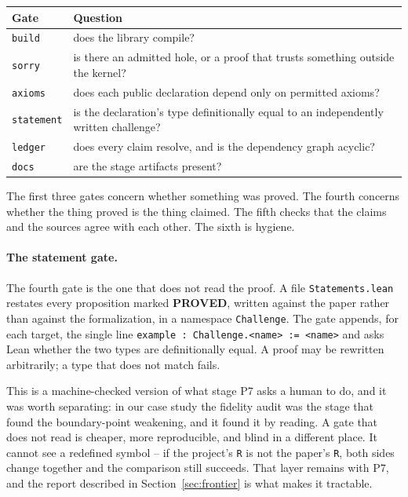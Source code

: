 \documentclass[11pt]{article}
\newcommand{\claim}[1]{\textbf{#1}}
\newcommand{\code}[1]{\texttt{#1}}
\begin{document}
\begin{center}
\begin{tabular}{@{}ll@{}}
\toprule
Gate & Question \\
\midrule
\code{build} & does the library compile? \\
\code{sorry} & is there an admitted hole, or a proof that trusts
  something outside the kernel? \\
\code{axioms} & does each public declaration depend only on permitted axioms? \\
\code{statement} & is the declaration's type definitionally equal to an
  independently written challenge? \\
\code{ledger} & does every claim resolve, and is the dependency graph acyclic? \\
\code{docs} & are the stage artifacts present? \\
\bottomrule
\end{tabular}
\end{center}

The first three gates concern whether something was proved. The fourth
concerns whether the thing proved is the thing claimed. The fifth checks
that the claims and the sources agree with each other. The sixth is
hygiene.

\paragraph{The statement gate.} The fourth gate is the one that does not read
the proof. A file \code{Statements.lean} restates every proposition marked
\claim{PROVED}, written against the paper rather than against the
formalization, in a namespace \code{Challenge}. The gate appends, for each
target, the single line \code{example : Challenge.<name> := <name>} and asks
Lean whether the two types are definitionally equal. A proof may be rewritten
arbitrarily; a type that does not match fails.

This is a machine-checked version of what stage P7 asks a human to do, and it
was worth separating: in our case study the fidelity audit was the stage that
found the boundary-point weakening, and it found it by reading. A gate that
does not read is cheaper, more reproducible, and blind in a different place.
It cannot see a redefined symbol -- if the project's \code{R} is not the
paper's \code{R}, both sides change together and the comparison still
succeeds. That layer remains with P7, and the report described in
Section~\ref{sec:frontier} is what makes it tractable.
\end{document}
